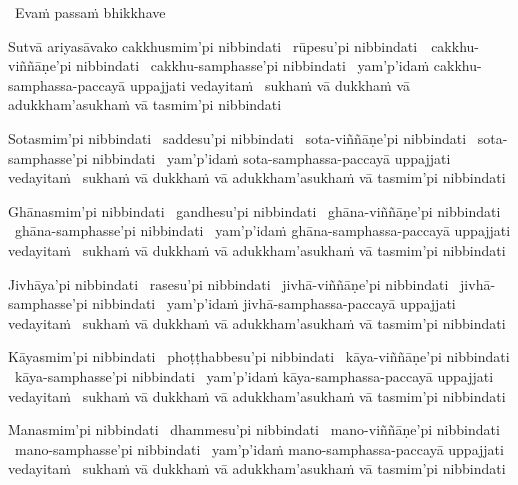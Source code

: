 \begin{pali-leader}
  \anglebracketleft\ \hspace{-0.5mm}Evaṁ passaṁ bhikkhave \hspace{-0.5mm}\anglebracketright\
\end{pali-leader}
\begin{pali-hangtogether}
  Sutvā ariyasāvako cakkhusmim'pi nibbindati \breathmark\ rūpesu'pi nibbindati~\breathmark\ cakkhu-viññāṇe'pi nibbindati \breathmark\ cakkhu-samphasse'pi nibbindati \breathmark\ yam'p'idaṁ cakkhu-samphassa-paccayā uppajjati vedayitaṁ \breathmark\ sukhaṁ vā dukkhaṁ vā adukkham'asukhaṁ vā tasmim'pi nibbindati
\end{pali-hangtogether}

\begin{pali-hang}
  Sotasmim'pi nibbindati \breathmark\ saddesu'pi nibbindati \breathmark\ sota-viññāṇe'pi nibbindati \breathmark\ sota-samphasse'pi nibbindati \breathmark\ yam'p'idaṁ sota-samphassa-paccayā uppajjati vedayitaṁ \breathmark\ sukhaṁ vā dukkhaṁ vā adukkham'asukhaṁ vā tasmim'pi nibbindati
\end{pali-hang}

\begin{pali-hang}
  Ghānasmim'pi nibbindati \breathmark\ gandhesu'pi nibbindati \breathmark\ ghāna-viññāṇe'pi nibbindati \breathmark\ ghāna-samphasse'pi nibbindati \breathmark\ yam'p'idaṁ ghāna-samphassa-paccayā uppajjati vedayitaṁ \breathmark\ sukhaṁ vā dukkhaṁ vā adukkham'asukhaṁ vā tasmim'pi nibbindati
\end{pali-hang}

\begin{pali-hang}
  Jivhāya'pi nibbindati \breathmark\ rasesu'pi nibbindati \breathmark\ jivhā-viññāṇe'pi nibbindati \breathmark\ jivhā-samphasse'pi nibbindati \breathmark\ yam'p'idaṁ jivhā-samphassa-paccayā uppajjati vedayitaṁ \breathmark\ sukhaṁ vā dukkhaṁ vā adukkham'asukhaṁ vā tasmim'pi nibbindati
\end{pali-hang}

\begin{pali-hang}
  Kāyasmim'pi nibbindati \breathmark\ phoṭṭhabbesu'pi nibbindati \breathmark\ kāya-viññāṇe'pi nibbindati \breathmark\ kāya-samphasse'pi nibbindati \breathmark\ yam'p'idaṁ kāya-samphassa-paccayā uppajjati vedayitaṁ \breathmark\ sukhaṁ vā dukkhaṁ vā adukkham'asukhaṁ vā tasmim'pi nibbindati
\end{pali-hang}

\begin{pali-hang}
  Manasmim'pi nibbindati \breathmark\ dhammesu'pi nibbindati \breathmark\ mano-viññāṇe'pi nibbindati \breathmark\ mano-samphasse'pi nibbindati \breathmark\ yam'p'idaṁ mano-samphassa-paccayā uppajjati vedayitaṁ \breathmark\ sukhaṁ vā dukkhaṁ vā adukkham'asukhaṁ vā tasmim'pi nibbindati
\end{pali-hang}

